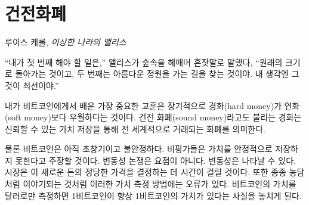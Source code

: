 \chapter{건전화폐}
\label{les:14}

\begin{chapquote}{루이스 캐롤, \textit{이상한 나라의 앨리스}}
	\begin{comment}	
		\enquote{The first thing I've got to do,} said Alice to herself, as she wandered about
		in the wood, \enquote{is to grow to my right size, and the second thing is to find my
			way into that lovely garden. I think that will be the best plan.}
	\end{comment}
	\enquote{내가 첫 번째 해야 할 일은,} 앨리스가 숲속을 헤매며 혼잣말로 말했다, \enquote{원래의 크기로 돌아가는 것이고, 
		두 번째는 아름다운 정원을 가는 길을 찾는 것이야. 내 생각엔 그것이 최선이야.}
\end{chapquote}

\begin{comment}	
	The most important lesson I have learned from Bitcoin is that in the
	long run, hard money is superior to soft money. Hard money, also
	referred to as \textit{sound money}, is any globally traded currency that
	serves as a reliable store of value.
\end{comment}
내가 비트코인에게서 배운 가장 중요한 교훈은 장기적으로 경화(hard money)가 연화(soft money)보다 우월하다는 것이다.
건전 화폐(sound money)라고도 불리는 경화는 신뢰할 수 있는 가치 저장을 통해 전 세계적으로 거래되는 화폐를 의미한다.

\begin{comment}	
	Granted, Bitcoin is still young and volatile. Critics will say that it
	does not store value reliably. The volatility argument is missing the
	point. Volatility is to be expected. The market will take a while to
	figure out the just price of this new money. Also, as is often jokingly
	pointed out, it is grounded in an error of measurement. If you think in
	dollars you will fail to see that one bitcoin will always be worth one
	bitcoin.
\end{comment}
물론 비트코인은 아직 초창기이고 불안정하다. 
비평가들은 가치를 안정적으로 저장하지 못한다고 주장할 것이다.
변동성 논쟁은 요점이 아니다. 
변동성은 나타날 수 있다. 
시장은 이 새로운 돈의 정당한 가격을 결정하는 데 시간이 걸릴 것이다. 
또한 종종 농담처럼 이야기되는 것처럼 이러한 가치 측정 방법에는 오류가 있다. 
비트코인의 가치를 달러로만 측정하면 1비트코인이 항상 1비트코인의 가치가 있다는 사실을 놓치게 된다.

